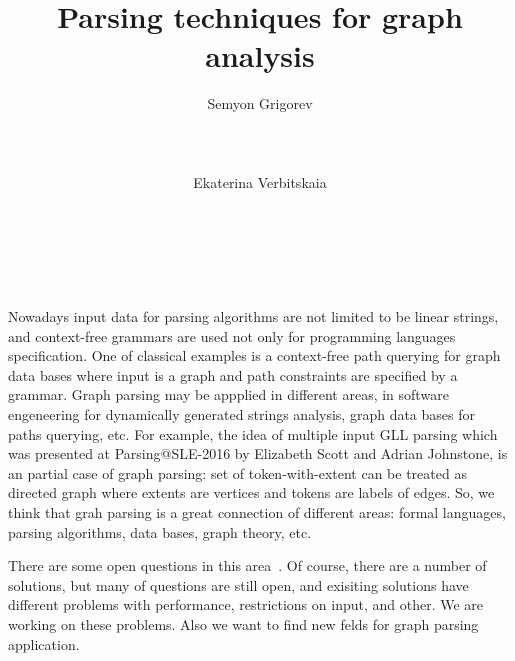 \documentclass{vldb}
\begin{document}
\makeatletter
\def\@copyrightspace{\relax}
\makeatother


\title{Parsing techniques for graph analysis}



\author{
\alignauthor
       Semyon Grigorev\\
       \\
       \\
       \\
\alignauthor
       Ekaterina Verbitskaia\\
       \\
       \\
       \\
}


\maketitle

Nowadays input data for parsing algorithms are not limited to be linear strings, and context-free grammars are used not only for programming languages specification.
One of classical examples is a context-free path querying for graph data bases where input is a graph and path constraints are specified by a grammar.
Graph parsing may be appplied in different areas, in software engeneering for dynamically generated strings analysis, graph data bases for paths querying, etc.
For example, the idea of multiple input GLL parsing which was presented at Parsing@SLE-2016 by Elizabeth Scott and Adrian Johnstone, is an partial case of graph parsing: 
set of token-with-extent can be treated as directed graph where extents are vertices and tokens are labels of edges.
So, we think that grah parsing is a great connection of different areas: formal languages, parsing algorithms, data bases, graph theory, etc.

There are some open questions in this area~\cite{Hellings, Yannakakis}.
Of course, there are a number of solutions, but many of questions are still open, and exisiting solutions have different problems with performance, restrictions on input, and other.
We are working on these problems.
Also we want to find new felds for graph parsing application.
\end{document}
